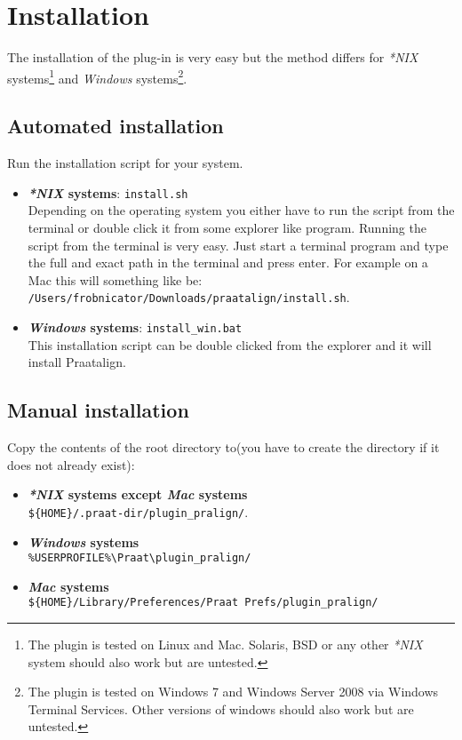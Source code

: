 \section{Installation}
\label{sec:installation}
The installation of the plug-in is very easy but the method differs for
\textit{*NIX} systems\footnote{The plugin is tested on Linux and Mac. Solaris,
BSD or any other \textit{*NIX} system should also work but are untested.}
and \textit{Windows} systems\footnote{The plugin is tested on Windows 7 and
Windows Server 2008 via Windows Terminal Services. Other versions of windows
should also work but are untested.}.
\subsection{Automated installation}
Run the installation script for your system.
\begin{itemize}
	\item \textbf{\textit{*NIX} systems}: \texttt{install.sh}\\
		Depending on the operating system you either have to run the script from
		the terminal or double click it from some explorer like program. Running
		the script from the terminal is very easy. Just start a terminal program
		and type the full and exact path in the terminal and press enter. For
		example on a Mac this will something like be:\\
		\texttt{/Users/frobnicator/Downloads/praatalign/install.sh}.
	\item \textbf{\textit{Windows} systems}: \texttt{install\_win.bat}\\
		This installation script can be double clicked from the explorer and it
		will install Praatalign.
\end{itemize}

\subsection{Manual installation}
Copy the contents of the root directory to(you have to create the directory if
it does not already exist):
\begin{itemize}
	\item \textbf{\textit{*NIX} systems except \textit{Mac} systems}\\
		\texttt{\$\{HOME\}/.praat-dir/plugin\_pralign/}.
	\item \textbf{\textit{Windows} systems}\\
		\texttt{\%USERPROFILE\%\textbackslash Praat\textbackslash plugin\_pralign/}
	\item \textbf{\textit{Mac} systems}\\
		\texttt{\$\{HOME\}/Library/Preferences/Praat Prefs/plugin\_pralign/}
\end{itemize}

